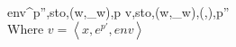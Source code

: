 \\[0.2cm]
	\inference[]{}
	{env\vdash \left\langle {}^{p''},sto,(w,\sqsubseteq_w),p \right\rangle \rightarrow \left\langle v,sto,(w,\sqsubseteq_w),(\emptyset,\emptyset),p'' \right\rangle}\\[0.3cm]
	Where $v=\left\langle x,e^{p'},env\right\rangle$
